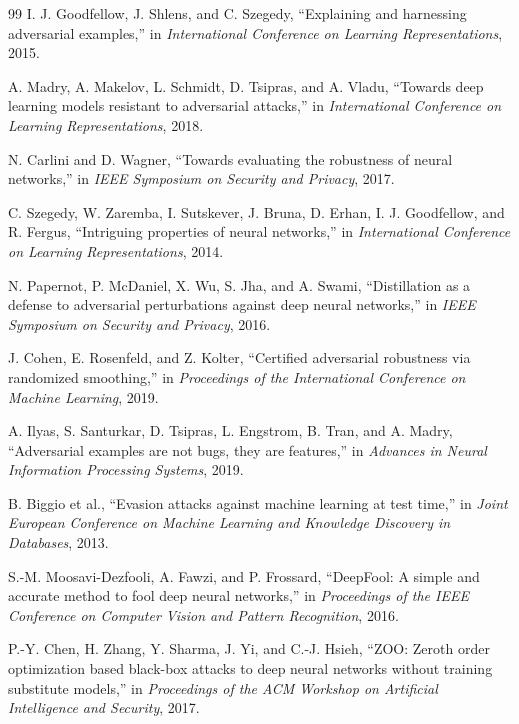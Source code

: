 \documentclass[10pt,conference]{IEEEtran}
\begin{document}
\begin{thebibliography}{99}
I. J. Goodfellow, J. Shlens, and C. Szegedy, ``Explaining and harnessing
adversarial examples,'' in \emph{International Conference on Learning
Representations}, 2015.

A. Madry, A. Makelov, L. Schmidt, D. Tsipras, and A. Vladu, ``Towards
deep learning models resistant to adversarial attacks,'' in
\emph{International Conference on Learning Representations}, 2018.

N. Carlini and D. Wagner, ``Towards evaluating the robustness of neural
networks,'' in \emph{IEEE Symposium on Security and Privacy}, 2017.

C. Szegedy, W. Zaremba, I. Sutskever, J. Bruna, D. Erhan, I. J. Goodfellow,
and R. Fergus, ``Intriguing properties of neural networks,'' in
\emph{International Conference on Learning Representations}, 2014.

N. Papernot, P. McDaniel, X. Wu, S. Jha, and A. Swami, ``Distillation as
a defense to adversarial perturbations against deep neural networks,'' in
\emph{IEEE Symposium on Security and Privacy}, 2016.

J. Cohen, E. Rosenfeld, and Z. Kolter, ``Certified adversarial robustness
via randomized smoothing,'' in \emph{Proceedings of the International
Conference on Machine Learning}, 2019.

A. Ilyas, S. Santurkar, D. Tsipras, L. Engstrom, B. Tran, and A. Madry,
``Adversarial examples are not bugs, they are features,'' in
\emph{Advances in Neural Information Processing Systems}, 2019.

B. Biggio et al., ``Evasion attacks against machine learning at test
time,'' in \emph{Joint European Conference on Machine Learning and
Knowledge Discovery in Databases}, 2013.

S.-M. Moosavi-Dezfooli, A. Fawzi, and P. Frossard, ``DeepFool: A simple
and accurate method to fool deep neural networks,'' in \emph{Proceedings
of the IEEE Conference on Computer Vision and Pattern Recognition}, 2016.

P.-Y. Chen, H. Zhang, Y. Sharma, J. Yi, and C.-J. Hsieh, ``ZOO: Zeroth
order optimization based black-box attacks to deep neural networks
without training substitute models,'' in \emph{Proceedings of the ACM
Workshop on Artificial Intelligence and Security}, 2017.


\end{thebibliography}
\end{document}
